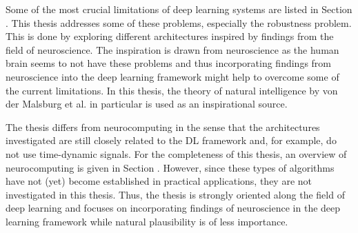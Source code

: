 Some of the most crucial limitations of deep learning systems are listed in Section .
This thesis addresses some of these problems, especially the robustness problem.
This is done by exploring different architectures inspired by findings from the field of neuroscience.
The inspiration is drawn from neuroscience as the human brain seems to not have these problems and thus incorporating findings from neuroscience into the deep learning framework might help to overcome some of the current limitations.
In this thesis, the theory of natural intelligence by von der Malsburg et al.  in particular is used as an inspirational source.

The thesis differs from neurocomputing in the sense that the architectures investigated are still closely related to the DL framework and, for example, do not use time-dynamic signals. 
For the completeness of this thesis, an overview of neurocomputing is given in Section .
However, since these types of algorithms have not (yet) become established in practical applications, they are not investigated in this thesis.
Thus, the thesis is strongly oriented along the field of deep learning and focuses on incorporating findings of neuroscience in the deep learning framework while natural plausibility is of less importance.


%


